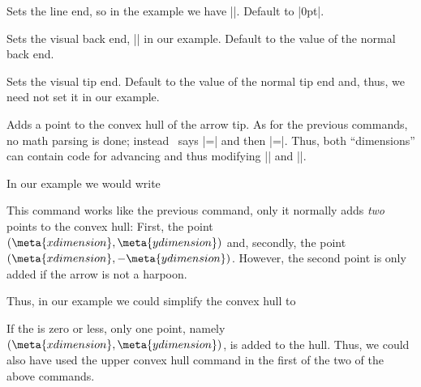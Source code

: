 \begin{command}{\pgfdeclarearrow{}}
\begin{itemize}
    \begin{command}{\pgfarrowssetlineend{}}
      Sets the line end, so in the example we have
      |\pgfarrowssettipend{-1cm}|. Default to |0pt|.
    \end{command}

    \begin{command}{\pgfarrowssetvisualbackend{}}
      Sets the visual back end, |\pgfarrowssetvisualbackend{-2cm}| in
      our example. Default to the value of the normal back end.
    \end{command}

    \begin{command}{\pgfarrowssetvisualtipend{}}
      Sets the visual tip end. Default to the value of the normal tip
      end and, thus, we need not set it in our example.
    \end{command}

    \begin{command}{\pgfarrowshullpoint{}}
      Adds a point to the convex hull of the arrow tip. As for the
      previous commands, no math parsing is done; instead \pgfname\
      says |\pgf@x=| and then |\pgf@y=|\meta{y
        dimension}. Thus, both ``dimensions'' can contain code for
      advancing and thus modifying |\pgf@x| and |\pgf@y|.

      In our example we would write
\begin{codeexample}
\pgfarrowshullpoint{1cm}{0pt}
\pgfarrowshullpoint{-3cm}{2cm}
\pgfarrowshullpoint{-3cm}{-2cm}
\end{codeexample}
    \end{command}


    \begin{command}{\pgfarrowsupperhullpoint{}}
      This command works like the previous command, only it normally
      adds \emph{two} points to the convex hull: First, the point $(\meta{x
        dimension},\meta{y dimension})$ and, secondly, the point $(\meta{x
        dimension},-\meta{y dimension})$. However, the second point is
      only added if the arrow is not a harpoon. 

      Thus, in our example we could simplify the convex hull to
\begin{codeexample}
\pgfarrowshullpoint{1cm}{0pt}
\pgfarrowsupperhullpoint{-3cm}{2cm}
\end{codeexample}
      If the  is zero or less, only one point,
      namely $(\meta{x dimension},\meta{y dimension})$, is added to
      the hull. Thus, we could also have used the upper convex hull
      command in the first of the two of the above commands.
    \end{command}


\end{itemize}
\end{command}
